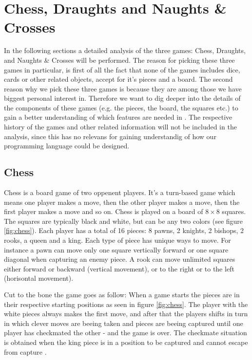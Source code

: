 \section{Chess, Draughts and Naughts \& Crosses}

In the following sections a detailed analysis of the three games: Chess, Draughts, and Naughts \& Crosses will be performed. The reason for picking these three games in particular, is first of all the fact that none of the games includes dice, cards or other related objects, accept for it's pieces and a board. The second reason why we pick these three games is because they are among those we have biggest personal interest in. Therefore we want to dig deeper into the details of the components of these games (e.g. the pieces, the board, the squares etc.) to gain a better understanding of which features are needed in \productname. The respective history of the games and other related information will not be included in the analysis, since this has no relevans for gaining understandig of how our programming language could be designed.  

\subsection{Chess}
Chess is a board game of two oppenent players. It's a turn-based game which means one player makes a move, 
then the other player makes a move, then the first player makes a move and so on. Chess is played on a board of $8 \times 8$ squares. The squares are typically black and white, but can be any two colors (see figure \ref{fig:chess}). 
Each player has a total of 16 pieces: 8 pawns, 2 knights, 2 bishops, 2 rooks, a queen and a king. Each type of piece has unique ways to move. For instance a pawn can move only one square vertically forward or one square diagonal when capturing an enemy piece. 
A rook can move unlimited squares either forward or backward (vertical movement), or to the right or to the left (horisontal movement). 

Cut to the bone the game goes as follow: When a game starts the pieces are in their respective starting positions as seen in figure \ref{fig:chess}. The player with the white pieces always makes the first move, and after that the players shifts in turn in which clever moves are beeing taken and pieces are beeing captured until one player has checkmated the other - and the game is over. The checkmate situation is obtained when the king piece is in a position to be captured and cannot escape from capture \cite{chessrules}.


